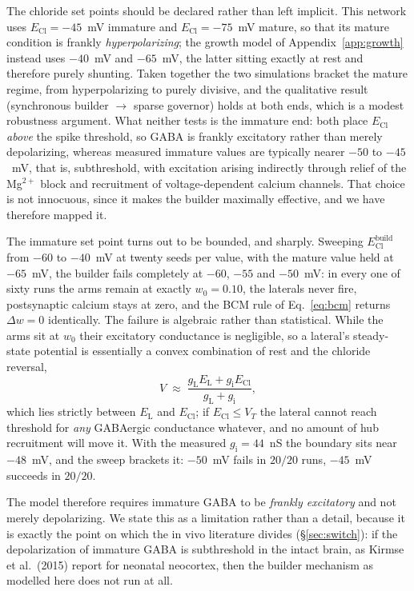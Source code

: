 \documentclass[11pt,a4paper]{article}
\newcommand{\ECl}{E_{\mathrm{Cl}}}
\begin{document}
The chloride set points should be declared rather than left implicit. This network uses $\ECl=-45$~mV immature and $\ECl=-75$~mV mature, so that its mature condition is frankly \emph{hyperpolarizing}; the growth model of Appendix~\ref{app:growth} instead uses $-40$~mV and $-65$~mV, the latter sitting exactly at rest and therefore purely shunting. Taken together the two simulations bracket the mature regime, from hyperpolarizing to purely divisive, and the qualitative result (synchronous builder $\to$ sparse governor) holds at both ends, which is a modest robustness argument. What neither tests is the immature end: both place $\ECl$ \emph{above} the spike threshold, so GABA is frankly excitatory rather than merely depolarizing, whereas measured immature values are typically nearer $-50$ to $-45$~mV, that is, subthreshold, with excitation arising indirectly through relief of the Mg$^{2+}$ block and recruitment of voltage-dependent calcium channels. That choice is not innocuous, since it makes the builder maximally effective, and we have therefore mapped it.

The immature set point turns out to be bounded, and sharply. Sweeping $\ECl^{\mathrm{build}}$ from $-60$ to $-40$~mV at twenty seeds per value, with the mature value held at $-65$~mV, the builder fails completely at $-60$, $-55$ and $-50$~mV: in every one of sixty runs the arms remain at exactly $w_0=0.10$, the laterals never fire, postsynaptic calcium stays at zero, and the BCM rule of Eq.~\eqref{eq:bcm} returns $\Delta w=0$ identically. The failure is algebraic rather than statistical. While the arms sit at $w_0$ their excitatory conductance is negligible, so a lateral's steady-state potential is essentially a convex combination of rest and the chloride reversal,
\[
V \;\approx\; \frac{g_{\mathrm{L}}E_{\mathrm{L}} + g_{\mathrm{i}}\ECl}{g_{\mathrm{L}}+g_{\mathrm{i}}},
\]
which lies strictly between $E_{\mathrm{L}}$ and $\ECl$; if $\ECl \leq V_{T}$ the lateral cannot reach threshold for \emph{any} GABAergic conductance whatever, and no amount of hub recruitment will move it. With the measured $g_{\mathrm{i}}=44$~nS the boundary sits near $-48$~mV, and the sweep brackets it: $-50$~mV fails in $20/20$ runs, $-45$~mV succeeds in $20/20$.

The model therefore requires immature GABA to be \emph{frankly excitatory} and not merely depolarizing. We state this as a limitation rather than a detail, because it is exactly the point on which the in vivo literature divides (\S\ref{sec:switch}): if the depolarization of immature GABA is subthreshold in the intact brain, as Kirmse et al.\ (2015) report for neonatal neocortex, then the builder mechanism as modelled here does not run at all.
\end{document}
